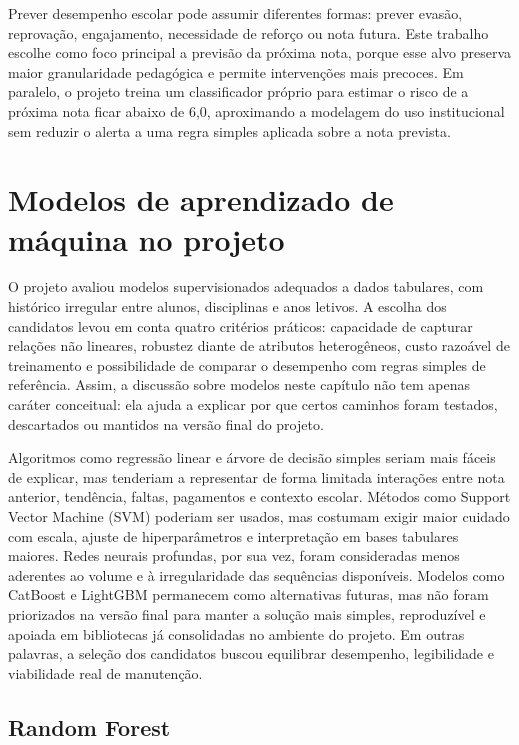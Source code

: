 Prever desempenho escolar pode assumir diferentes formas: prever evas\~ao, reprova\c{c}\~ao, engajamento, necessidade de refor\c{c}o ou nota futura. Este trabalho escolhe como foco principal a previs\~ao da pr\'oxima nota, porque esse alvo preserva maior granularidade pedag\'ogica e permite interven\c{c}\~oes mais precoces. Em paralelo, o projeto treina um classificador pr\'oprio para estimar o risco de a pr\'oxima nota ficar abaixo de 6,0, aproximando a modelagem do uso institucional sem reduzir o alerta a uma regra simples aplicada sobre a nota prevista.

\section{Modelos de aprendizado de m\'aquina no projeto}
\label{sec:modelos-projeto}

O projeto avaliou modelos supervisionados adequados a dados tabulares, com hist\'orico irregular entre alunos, disciplinas e anos letivos. A escolha dos candidatos levou em conta quatro crit\'erios pr\'aticos: capacidade de capturar rela\c{c}\~oes n\~ao lineares, robustez diante de atributos heterog\^eneos, custo razo\'avel de treinamento e possibilidade de comparar o desempenho com regras simples de refer\^encia. Assim, a discuss\~ao sobre modelos neste cap\'itulo n\~ao tem apenas car\'ater conceitual: ela ajuda a explicar por que certos caminhos foram testados, descartados ou mantidos na vers\~ao final do projeto.

Algoritmos como regress\~ao linear e \'arvore de decis\~ao simples seriam mais f\'aceis de explicar, mas tenderiam a representar de forma limitada intera\c{c}\~oes entre nota anterior, tend\^encia, faltas, pagamentos e contexto escolar. M\'etodos como Support Vector Machine (SVM) poderiam ser usados, mas costumam exigir maior cuidado com escala, ajuste de hiperpar\^ametros e interpreta\c{c}\~ao em bases tabulares maiores. Redes neurais profundas, por sua vez, foram consideradas menos aderentes ao volume e \`a irregularidade das sequ\^encias dispon\'iveis. Modelos como CatBoost e LightGBM permanecem como alternativas futuras, mas n\~ao foram priorizados na vers\~ao final para manter a solu\c{c}\~ao mais simples, reproduz\'ivel e apoiada em bibliotecas j\'a consolidadas no ambiente do projeto. Em outras palavras, a sele\c{c}\~ao dos candidatos buscou equilibrar desempenho, legibilidade e viabilidade real de manuten\c{c}\~ao.

\subsection{Random Forest}
\label{subsec:random-forest}

